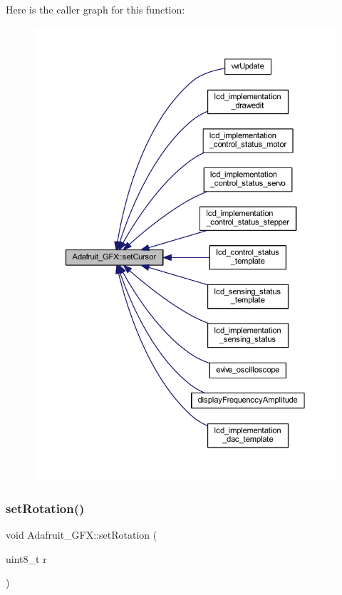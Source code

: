 Here is the caller graph for this function\+:\nopagebreak
\begin{figure}[H]
\begin{center}
\leavevmode
\includegraphics[width=350pt]{class_adafruit___g_f_x_aaf96a40cad0f34dd8ec73494b3866c33_icgraph}
\end{center}
\end{figure}
\mbox{\label{class_adafruit___g_f_x_a6ac337c49876cee23ed062a928724675}} 
\subsubsection{\texorpdfstring{set\+Rotation()}{setRotation()}}
{\footnotesize\ttfamily void Adafruit\+\_\+\+G\+F\+X\+::set\+Rotation (\begin{DoxyParamCaption}\item[{uint8\+\_\+t}]{r }\end{DoxyParamCaption})}

